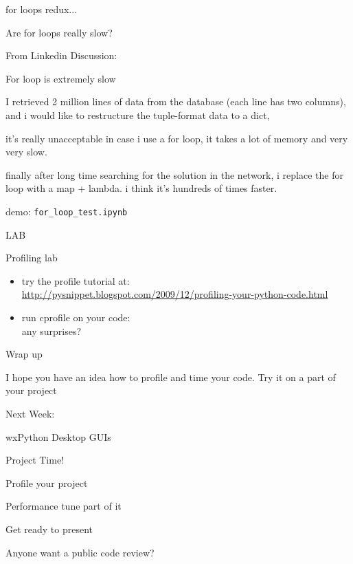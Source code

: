 \documentclass{beamer}
\begin{document}
\begin{frame}[fragile]{for loops redux...}

{\LARGE Are for loops really slow?}

\vfill
{\Large From Linkedin Discussion:}

\vfill
{\large For loop is extremely slow}

I retrieved 2 million lines of data from the database (each line has two columns), and i would like to restructure the tuple-format data to a dict,

it's really unacceptable in case i use a for loop, it takes a lot of memory and very very slow.

finally after long time searching for the solution in the network, i replace the for loop with a map + lambda. i think it's hundreds of times faster.


\vfill
demo: \verb|for_loop_test.ipynb|

\end{frame} 

\begin{frame}[fragile]{LAB}

{\Large Profiling lab}
\begin{itemize}
  \item try the profile tutorial at:\\
        {\small \url{http://pysnippet.blogspot.com/2009/12/profiling-your-python-code.html} }

  \item run cprofile on your code:\\
        any surprises? 
\end{itemize}

\end{frame}


\begin{frame}[fragile]{Wrap up}

\vfill
{\Large I hope you have an idea how to profile and time your code.}
\vfill
{\Large Try it on a part of your project}
\vfill

\end{frame}

\begin{frame}{Next Week:}

\vfill
{\LARGE wxPython Desktop GUIs}

\vfill

\end{frame}

\begin{frame}[fragile]{Project Time!}

\vfill
\Large{Profile your project}

\vfill
\Large{Performance tune part of it}

\vfill
\Large{Get ready to present}

\vfill
\Large{Anyone want a public code review?}

\end{frame}
\end{document}
